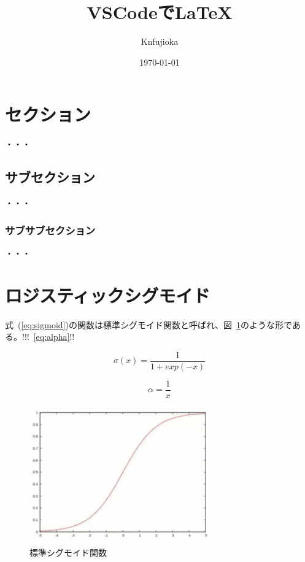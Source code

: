 \documentclass[a4paper,11pt]{jsarticle}
\begin{document}
\title{VSCodeで\LaTeX}
\author{Knfujioka}
\date{\today}
\maketitle

\tableofcontents
\section{セクション}
  ・・・
\subsection{サブセクション}
  ・・・
\subsubsection{サブサブセクション}
  ・・・


\section{ロジスティックシグモイド}

式~(\ref{eq:sigmoid})の関数は標準シグモイド関数と呼ばれ、図~\ref{fig:sigmoid}のような形である。!!!~\ref{eq:alpha}!!


\begin{equation}
    \sigma(x) = \frac{1}{1 + exp(-x)}
    \label{eq:sigmoid}
\end{equation}

\begin{equation}
    \alpha = \frac{1}{x}
    \label{eq:alpha}
\end{equation}

\begin{figure}[htbp]
    \centering
    \includegraphics[width=8cm]{images/sigmoid.png}
    \caption{標準シグモイド関数}
    \label{fig:sigmoid}
\end{figure}
\end{document}
